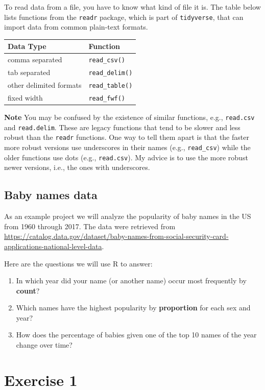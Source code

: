 \documentclass[]{book}
\providecommand{\tightlist}{%
  \setlength{\itemsep}{0pt}\setlength{\parskip}{0pt}}
\begin{document}
To read data from a file, you have to know what kind of file it is. The
table below lists functions from the \texttt{readr} package, which is
part of \texttt{tidyverse}, that can import data from common plain-text
formats.

\begin{longtable}[]{@{}ll@{}}
\toprule
Data Type & Function\tabularnewline
\midrule
\endhead
comma separated & \texttt{read\_csv()}\tabularnewline
tab separated & \texttt{read\_delim()}\tabularnewline
other delimited formats & \texttt{read\_table()}\tabularnewline
fixed width & \texttt{read\_fwf()}\tabularnewline
\bottomrule
\end{longtable}

\textbf{Note} You may be confused by the existence of similar functions,
e.g., \texttt{read.csv} and \texttt{read.delim}. These are legacy
functions that tend to be slower and less robust than the \texttt{readr}
functions. One way to tell them apart is that the faster more robust
versions use underscores in their names (e.g., \texttt{read\_csv}) while
the older functions use dots (e.g., \texttt{read.csv}). My advice is to
use the more robust newer versions, i.e., the ones with underscores.

\subsection{Baby names data}\label{baby-names-data}

As an example project we will analyze the popularity of baby names in
the US from 1960 through 2017. The data were retrieved from
\url{https://catalog.data.gov/dataset/baby-names-from-social-security-card-applications-national-level-data}.

Here are the questions we will use R to answer:

\begin{enumerate}
\def\labelenumi{\arabic{enumi}.}
\tightlist
\item
  In which year did your name (or another name) occur most frequently by
  \textbf{count}?
\item
  Which names have the highest popularity by \textbf{proportion} for
  each sex and year?
\item
  How does the percentage of babies given one of the top 10 names of the
  year change over time?
\end{enumerate}

\section{Exercise 1}\label{exercise-1}
\end{document}
